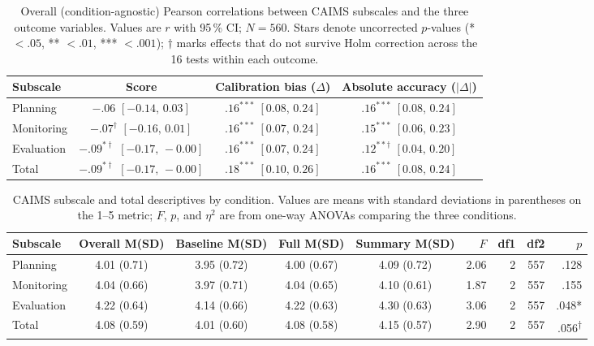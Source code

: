 \documentclass[acmlarge,review=true, anonymous=true]{acmart}
\begin{document}
\begin{table}[H]
\centering
\caption{Overall (condition-agnostic) Pearson correlations between
CAIMS subscales and the three outcome variables. Values are
$r$ with 95\,\% CI; $N = 560$. Stars denote uncorrected $p$-values
(* $<.05$, ** $<.01$, *** $<.001$); $\dagger$ marks effects that
do not survive Holm correction across the 16 tests within each
outcome.}
\label{tab:caims-overall}
\begin{tabular}{lccc}
\hline Subscale     & Score                                & Calibration bias ($\Delta$)             & Absolute accuracy ($|\Delta|$)        \\ \hline
Planning             & $-.06$ $[-0.14,\,0.03]$              & $.16^{***}$ $[0.08,\,0.24]$            & $.16^{***}$ $[0.08,\,0.24]$           \\
Monitoring           & $-.07^{\dagger}$ $[-0.16,\,0.01]$    & $.16^{***}$ $[0.07,\,0.24]$            & $.15^{***}$ $[0.06,\,0.23]$           \\
Evaluation           & $-.09^{*\dagger}$ $[-0.17,\,-0.00]$  & $.16^{***}$ $[0.07,\,0.24]$            & $.12^{**\dagger}$ $[0.04,\,0.20]$     \\
Total                & $-.09^{*\dagger}$ $[-0.17,\,-0.00]$  & $.18^{***}$ $[0.10,\,0.26]$            & $.16^{***}$ $[0.08,\,0.24]$           \\
\hline
\end{tabular}
\end{table}

\begin{table}[H]
\centering
\caption{CAIMS subscale and total descriptives by condition. Values
are means with standard deviations in parentheses on the 1--5 metric;
$F$, $p$, and $\eta^2$ are from one-way ANOVAs comparing the three
conditions.}
\label{tab:caims-means}
\begin{tabular}{lccccrrrr}
\hline Subscale     & Overall M(SD) & Baseline M(SD) & Full M(SD)   & Summary M(SD) & $F$  & df1 & df2 & $p$ \\ \hline
Planning             & 4.01 (0.71)   & 3.95 (0.72)    & 4.00 (0.67)  & 4.09 (0.72)   & 2.06 & 2   & 557 & .128   \\
Monitoring           & 4.04 (0.66)   & 3.97 (0.71)    & 4.04 (0.65)  & 4.10 (0.61)   & 1.87 & 2   & 557 & .155   \\
Evaluation           & 4.22 (0.64)   & 4.14 (0.66)    & 4.22 (0.63)  & 4.30 (0.63)   & 3.06 & 2   & 557 & .048*  \\
Total                & 4.08 (0.59)   & 4.01 (0.60)    & 4.08 (0.58)  & 4.15 (0.57)   & 2.90 & 2   & 557 & .056\textsuperscript{$\dagger$} \\
\hline
\end{tabular}
\end{table}
\end{document}
